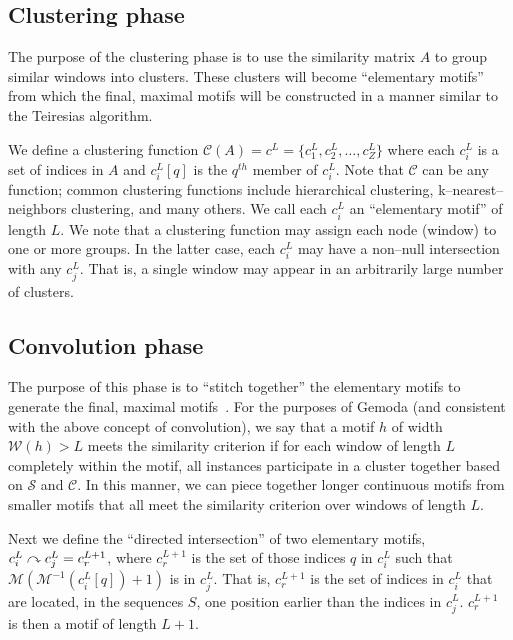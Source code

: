     \subsection{Clustering phase}
    The purpose of the clustering phase is to
    use the similarity matrix $A$ to group
    similar windows into clusters.
    These clusters will become
    ``elementary motifs'' from which the final,
    maximal motifs will be constructed in a manner similar to the Teiresias algorithm.

    We define a clustering function $\mathscr{C}(A)
    = c^L = \{c_1^{L}, c_2^{L},\ldots, c_Z^{L}\}$
    where each $c_i^L$ is a set of indices in $A$ and
    $c_i^{L}[q]$ is the $q^{th}$ member of $c_i^L$.
    Note that $\mathscr{C}$ can be any function;
    common clustering functions include hierarchical
    clustering, k--nearest--neighbors clustering,
    and many others.  We call each $c_i^L$ an
    ``elementary motif''
    of length $L$.  We
    note that a clustering function may assign each
    node (window) to one or more groups.
    In the latter case, each $c_i^L$ may have a
    non--null intersection with any $c_j^L$.  That is, a single
    window may appear in an arbitrarily large number of clusters.


    \subsection{Convolution phase}

    The purpose of this phase is to ``stitch together''
    the elementary motifs to generate the final,
    maximal motifs~\citep{rigoutsos1998combinatorial}.
    For the purposes of Gemoda (and consistent with
    the above concept of convolution), we say that a
    motif $h$ of width $\mathscr{W}(h) > L$ meets the
    similarity criterion if for each window of length
    $L$ completely within the motif, all instances
    participate in a cluster together based on
    $\mathscr{S}$ and $\mathscr{C}$.  In this manner,
    we can piece together longer continuous motifs
    from smaller motifs that all meet the similarity
    criterion over windows of length $L$.

    Next we define the ``directed intersection''
    of two elementary motifs, $c_i^L \curvearrowright c_j^L
    = c_r^{L+1}$, where $c_r^{L+1}$ is the set of those
    indices $q$ in $c_i^L$ such that $\mathscr{M}(
    \mathscr{M}^{-1}(c_i^{L}[q])+1 )$ is in $c_j^L$.
    That is, $c_r^{L+1}$ is the set of indices in $c_i^L$
    that are located, in the sequences $S$, one
    position earlier than the indices in $c_j^L$.
    $c_r^{L+1}$ is then a motif of length $L+1$.

